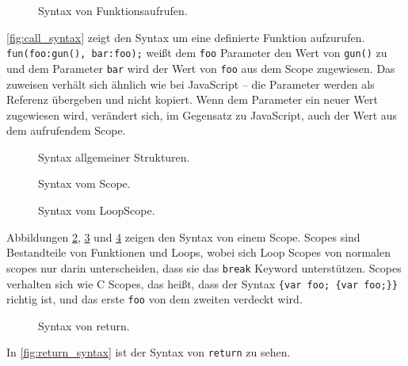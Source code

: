     \begin{figure}[H]
      \centering
      
      \caption{Syntax von Funktionsaufrufen.}
      \label{fig:call_syntax}
    \end{figure}
    \autoref{fig:call_syntax} zeigt den Syntax um eine definierte Funktion aufzurufen. \lstinline[style=MyMacroStyle]$fun(foo:gun(), bar:foo);$ weißt dem \lstinline[style=MyMacroStyle]$foo$ Parameter den Wert von \lstinline[style=MyMacroStyle]$gun()$ zu und dem Parameter \lstinline[style=MyMacroStyle]$bar$ wird der Wert von \lstinline[style=MyMacroStyle]$foo$ aus dem Scope zugewiesen. Das zuweisen verhält sich ähnlich wie bei JavaScript -- die Parameter werden als Referenz übergeben und nicht kopiert. Wenn dem Parameter ein neuer Wert zugewiesen wird, verändert sich, im Gegensatz zu JavaScript, auch der Wert aus dem aufrufendem Scope.

    \begin{figure}[H]
      \centering
      
      \caption{Syntax allgemeiner Strukturen.}
      \label{fig:common_syntax}
    \end{figure}

    \begin{figure}[H]
      \centering
      
      \caption{Syntax vom Scope.}
      \label{fig:scope_syntax}
    \end{figure}

    \begin{figure}[H]
      \centering
      
      \caption{Syntax vom LoopScope.}
      \label{fig:loop_scope_syntax}
    \end{figure}
    Abbildungen \ref{fig:common_syntax}, \ref{fig:scope_syntax} und \ref{fig:loop_scope_syntax} zeigen den Syntax von einem Scope. Scopes sind Bestandteile von Funktionen und Loops, wobei sich Loop Scopes von normalen scopes nur darin unterscheiden, dass sie das \lstinline[style=MyMacroStyle]$break$ Keyword unterstützen. Scopes verhalten sich wie C Scopes, das heißt, dass der Syntax \lstinline[style=MyMacroStyle]${var foo; {var foo;}}$ richtig ist, und das erste \lstinline[style=MyMacroStyle]$foo$ von dem zweiten verdeckt wird.

    \begin{figure}[H]
      \centering
      
      \caption{Syntax von return.}
      \label{fig:return_syntax}
    \end{figure}
    In \autoref{fig:return_syntax} ist der Syntax von \lstinline[style=MyMacroStyle]$return$ zu sehen.

